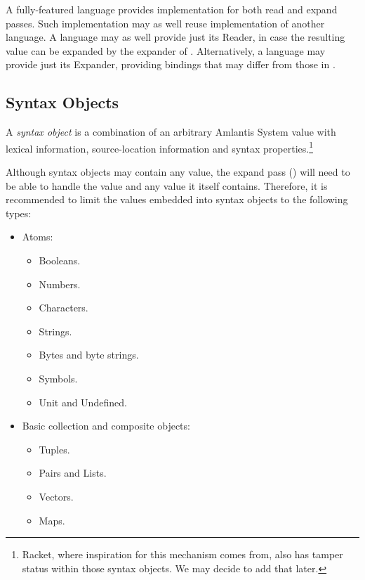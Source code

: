 A fully-featured language provides implementation for both read and expand passes. Such implementation may as well reuse implementation of another language. A language may as well provide just its Reader, in case the resulting value can be expanded by the expander of \AmlBase. Alternatively, a language may provide just its Expander, providing bindings that may differ from those in \AmlBase.





\subsection{Syntax Objects}
\label{subsec:environment-language-syntax-objects}

A {\em syntax object} is a combination of an arbitrary Amlantis System value with lexical information, source-location information and syntax properties.\footnote{Racket, where inspiration for this mechanism comes from, also has tamper status within those syntax objects. We may decide to add that later.}

Although syntax objects may contain any value, the expand pass () will need to be able to handle the value and any value it itself contains. Therefore, it is recommended to limit the values embedded into syntax objects to the following types:

\begin{itemize}
  \item Atoms:
  \begin{itemize}
    \item Booleans.
    \item Numbers.
    \item Characters.
    \item Strings.
    \item Bytes and byte strings.
    \item Symbols.
    \item Unit and Undefined.
  \end{itemize}
  \item Basic collection and composite objects:
  \begin{itemize}
    \item Tuples.
    \item Pairs and Lists.
    \item Vectors.
    \item Maps.
  \end{itemize}
\end{itemize}




